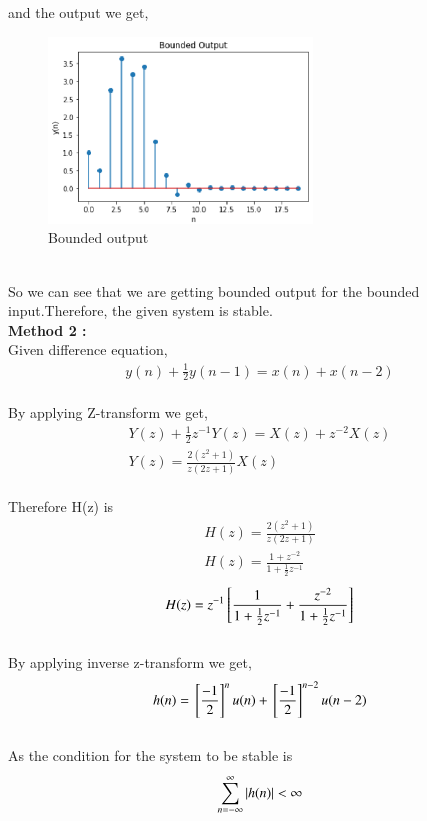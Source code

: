 \documentclass[journal,12pt,twocolumn]{IEEEtran}
\begin{document}
and the output we get,\\
\begin{figure}[h!]
    \centering
    \includegraphics[width=7cm]{./figures/OUTPUT.eps}
    \caption{Bounded output}
    \label{yn}
\end{figure} \\
So we can see that we are getting bounded output for the bounded input.Therefore,
the given system is stable.\\
\textbf{Method 2 :}
\\
Given difference equation,
\begin{align}
y(n)+\frac{1}{2}y(n-1) = x(n)+x(n-2) 
\end{align}\\
By applying Z-transform we get, \\
\begin{align}
Y(z) + \frac{1}{2}z^{-1}Y(z)=X(z) + z^{-2}X(z)\\
Y(z)=\frac{2(z^2+1)}{z(2z+1)}X(z)
\end{align}\\
Therefore H(z) is \\
\begin{align}
H(z) = \frac{2(z^2+1)}{z(2z+1)} \\
H(z) = \frac{1+z^{-2}}{1+\frac{1}{2}z^{-1}}
\end{align}
\begin{align}
H(z)= z^{-1}{}\left[\frac{1}{1+\frac{1}{2}z^{-1}} + \frac{z^{-2}}{1+\frac{1}{2}z^{-1}}\right]
\end{align}\\
By applying inverse z-transform we get,\\
\begin{align}
    h(n)={}\left[\frac{-1}{2}\right]^nu(n) + {}\left[\frac{-1}{2}\right]^{n-2}u(n-2)
\end{align}\\
As the condition for the system to be stable is
\begin{align}
\sum_{n=-\infty}^{\infty} \left\vert h(n)\right\vert < \infty
\end{align}\\
\end{document}
